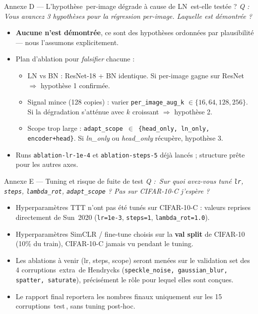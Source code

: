 \documentclass[10pt,aspectratio=169]{beamer}
\newcommand{\code}[1]{\texttt{\small #1}}
\newcommand{\qbox}[1]{\textit{\textcolor{accent}{Q : #1}}\par\smallskip}
\begin{document}
\begin{frame}{Annexe D --- L'hypothèse \guillemotleft\,per-image dégrade à cause de LN\,\guillemotright{} est-elle testée ?}
  \qbox{\guillemotleft\,Vous avancez 3 hypothèses pour la régression per-image. Laquelle est démontrée ?\,\guillemotright{}}

  \begin{itemize}
    \item \textbf{Aucune n'est démontrée}, ce sont des hypothèses ordonnées par plausibilité --- nous l'assumons explicitement.
    \item Plan d'ablation pour \emph{falsifier} chacune :
    \begin{itemize}\small
      \item \alert{LN vs BN} : ResNet-18 + BN identique. Si per-image gagne sur ResNet $\Rightarrow$ hypothèse 1 confirmée.
      \item \alert{Signal mince (128 copies)} : varier \code{per\_image\_aug\_k} $\in \{16, 64, 128, 256\}$. Si la dégradation s'atténue avec $k$ croissant $\Rightarrow$ hypothèse 2.
      \item \alert{Scope trop large} : \code{adapt\_scope $\in$ \{head\_only, ln\_only, encoder+head\}}. Si \emph{ln\_only} ou \emph{head\_only} récupère, hypothèse 3.
    \end{itemize}
    \item Runs \code{ablation-lr-1e-4} et \code{ablation-steps-5} déjà lancés ; structure prête pour les autres axes.
  \end{itemize}
\end{frame}

\begin{frame}{Annexe E --- Tuning et risque de fuite de test}
  \qbox{\guillemotleft\,Sur quoi avez-vous tuné \code{lr}, \code{steps}, \code{lambda\_rot}, \code{adapt\_scope} ? Pas sur CIFAR-10-C j'espère ?\,\guillemotright{}}

  \begin{itemize}
    \item Hyperparamètres TTT \alert{n'ont pas été tunés} sur CIFAR-10-C : valeurs reprises directement de Sun~2020 (\code{lr=1e-3}, \code{steps=1}, \code{lambda\_rot=1.0}).
    \item Hyperparamètres SimCLR / fine-tune choisis sur la \textbf{val split} de CIFAR-10 (10\% du train), CIFAR-10-C jamais vu pendant le tuning.
    \item Les ablations à venir (lr, steps, scope) seront menées sur le \alert{validation set des 4 corruptions \guillemotleft\,extra\,\guillemotright{}} de Hendrycks (\code{speckle\_noise, gaussian\_blur, spatter, saturate}), précisément le rôle pour lequel elles sont conçues.
    \item Le rapport final reportera les nombres finaux uniquement sur les 15 corruptions \guillemotleft\,test\,\guillemotright{}, sans tuning post-hoc.
  \end{itemize}
\end{frame}
\end{document}
